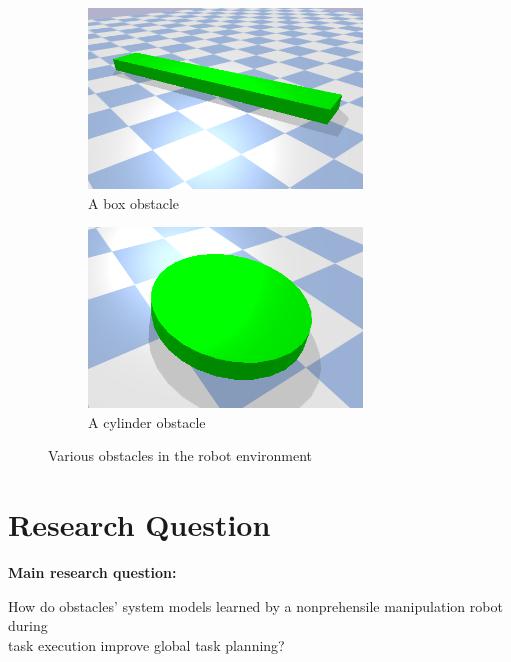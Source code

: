 \begin{figure}[H]
    \centering
    \begin{subfigure}{.5\textwidth}
    \centering
    \includegraphics[width=0.8\textwidth]{figures/box_obstacle.png}
    \caption{A box obstacle}
    \end{subfigure}%
    \begin{subfigure}{.5\textwidth}
    \centering
    \includegraphics[width=0.8\textwidth]{figures/cylinder_obstacle.png}
    \caption{A cylinder obstacle}
    \end{subfigure}%
    \caption{Various obstacles in the robot environment}
    \label{fig:example_obstacles}
\end{figure}



\section{Research Question}

\textbf{Main research question:}
\begin{center}
\label{researchquestion:main}
\large
How do obstacles' system models learned by a nonprehensile manipulation robot during\\  task execution improve global task planning?
\end{center} 

